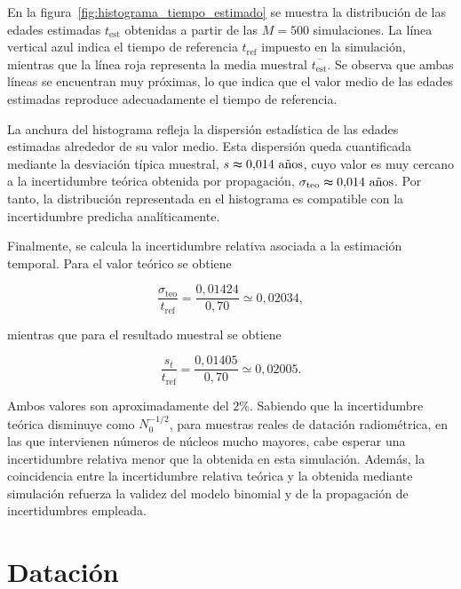 \documentclass[12pt,a4paper]{article}
\begin{document}
En la figura~\ref{fig:histograma_tiempo_estimado} se muestra la distribución de las edades estimadas $t_{\mathrm{est}}$ obtenidas a partir de las $M=500$ simulaciones. La línea vertical azul indica el tiempo de referencia $t_{\mathrm{ref}}$ impuesto en la simulación, mientras que la línea roja representa la media muestral $\overline{t_{\mathrm{est}}}$. Se observa que ambas líneas se encuentran muy próximas, lo que indica que el valor medio de las edades estimadas reproduce adecuadamente el tiempo de referencia.

La anchura del histograma refleja la dispersión estadística de las edades estimadas alrededor de su valor medio. Esta dispersión queda cuantificada mediante la desviación típica muestral, $s\thickapprox 0{,}014~\text{años}$, cuyo valor es muy cercano a la incertidumbre teórica obtenida por propagación, $\sigma_{\mathrm{teo}}\thickapprox0{,}014~\text{años}$. Por tanto, la distribución representada en el histograma es compatible con la incertidumbre predicha analíticamente.

Finalmente, se calcula la incertidumbre relativa asociada a la estimación temporal. Para el valor teórico se obtiene

\begin{equation}
\frac{\sigma_{\mathrm{teo}}}{t_{\mathrm{ref}}}
=
\frac{0{,}01424}{0{,}70}
\simeq 0{,}02034,
\end{equation}

mientras que para el resultado muestral se obtiene

\begin{equation}
\frac{s_t}{t_{\mathrm{ref}}}
=
\frac{0{,}01405}{0{,}70}
\simeq 0{,}02005.
\end{equation}

Ambos valores son aproximadamente del $2\%$. Sabiendo que la incertidumbre teórica disminuye como $N_0^{-1/2}$, para muestras reales de datación radiométrica, en las que intervienen números de núcleos mucho mayores, cabe esperar una incertidumbre relativa menor que la obtenida en esta simulación. Además, la coincidencia entre la incertidumbre relativa teórica y la obtenida mediante simulación refuerza la validez del modelo binomial y de la propagación de incertidumbres empleada.






\newpage
\section{Datación}
\end{document}
